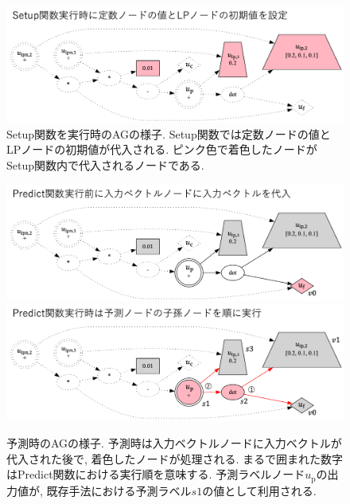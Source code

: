 \documentclass[11pt,oneside,openany,report]{jsbook}
\begin{document}
\begin{figure}
  \centering
  \includegraphics[width=14cm]{mgg_automl_zero_vag/ag/setup.png}
  \caption{Setup関数を実行時のAGの様子. Setup関数では定数ノードの値とLPノードの初期値が代入される. ピンク色で着色したノードがSetup関数内で代入されるノードである.}
  \label{fig:mgg_automl_zero_vag:setup}
\end{figure}
\begin{figure}
  \includegraphics[width=14cm]{mgg_automl_zero_vag/ag/before_predict.png}
  \includegraphics[width=14cm]{mgg_automl_zero_vag/ag/predict.png}
  \caption{予測時のAGの様子. 予測時は入力ベクトルノードに入力ベクトルが代入された後で, 着色したノードが処理される. まるで囲まれた数字はPredict関数における実行順を意味する. 予測ラベルノード$u_\mathrm{p}$の出力値が, 既存手法における予測ラベル$s1$の値として利用される.}
  \label{fig:mgg_automl_zero_vag:predict}
\end{figure}
\end{document}
